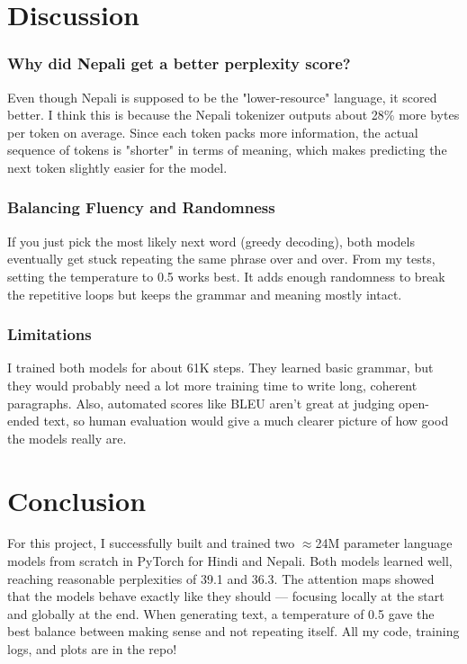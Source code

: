 \documentclass[11pt,a4paper]{article}
\begin{document}
\section{Discussion}

\subsubsection*{Why did Nepali get a better perplexity score?}
Even though Nepali is supposed to be the "lower-resource" language, it scored better. I think this is because the Nepali tokenizer outputs about 28\% more bytes per token on average. Since each token packs more information, the actual sequence of tokens is "shorter" in terms of meaning, which makes predicting the next token slightly easier for the model. 

\subsubsection*{Balancing Fluency and Randomness}
If you just pick the most likely next word (greedy decoding), both models eventually get stuck repeating the same phrase over and over. From my tests, setting the temperature to 0.5 works best. It adds enough randomness to break the repetitive loops but keeps the grammar and meaning mostly intact. 

\subsubsection*{Limitations}
I trained both models for about 61K steps. They learned basic grammar, but they would probably need a lot more training time to write long, coherent paragraphs. Also, automated scores like BLEU aren't great at judging open-ended text, so human evaluation would give a much clearer picture of how good the models really are.

\section{Conclusion}

For this project, I successfully built and trained two $\approx$24M parameter language models from scratch in PyTorch for Hindi and Nepali. Both models learned well, reaching reasonable perplexities of 39.1 and 36.3. The attention maps showed that the models behave exactly like they should --- focusing locally at the start and globally at the end. When generating text, a temperature of 0.5 gave the best balance between making sense and not repeating itself. All my code, training logs, and plots are in the repo!
\end{document}
